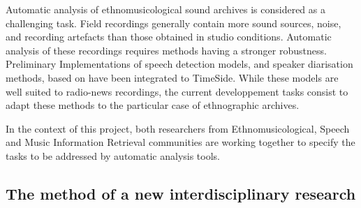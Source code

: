\documentclass{sig-alternate}
\begin{document}
Automatic analysis of ethnomusicological sound archives is considered as a challenging task.
Field recordings generally contain more sound sources, noise, and recording artefacts than those obtained in studio conditions.
Automatic analysis of these recordings requires methods having a stronger robustness.
Preliminary Implementations  of speech detection models, and speaker diarisation methods, based on  \cite{barras2006multistage} have been integrated to TimeSide. 
While these models are well suited to radio-news recordings, the current developpement tasks consist to adapt these methods to the particular case of ethnographic archives.

In the context of this project, both researchers from Ethnomusicological, Speech and Music Information Retrieval communities are working together to specify the tasks to be addressed by automatic analysis tools.


\subsection{The method of a new interdisciplinary research}
\end{document}
